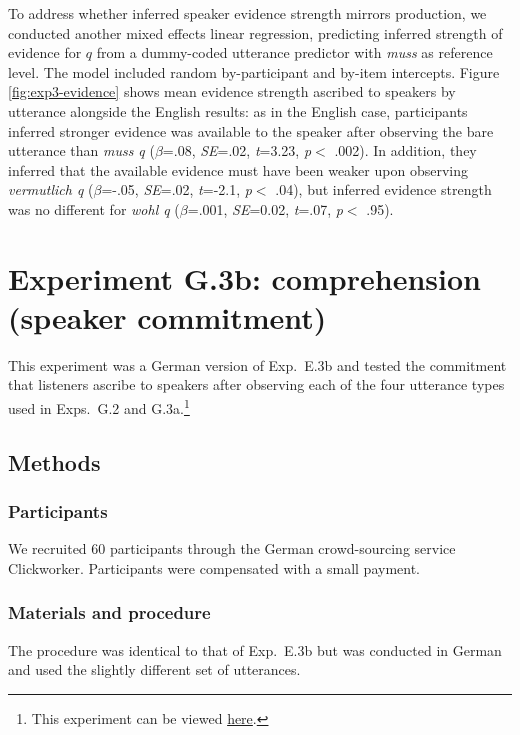 \documentclass[11pt]{article}
\newcommand{\figref}[1]{Figure \ref{#1}}
\begin{document}
To address whether inferred speaker evidence strength mirrors production, we conducted another mixed effects linear regression, predicting inferred strength of evidence for $q$ from a dummy-coded utterance predictor with \emph{muss} as reference level. The model included random by-participant and by-item intercepts.  \figref{fig:exp3-evidence} shows mean evidence strength ascribed to speakers by utterance alongside the English results: as in the English case, participants inferred stronger evidence was available to the speaker after observing the bare utterance than \emph{muss q} ($\beta$=.08, \emph{SE}=.02, \emph{t}=3.23, \emph{p}$<$ .002). In addition, they inferred that the available evidence must have been weaker upon observing \emph{vermutlich q} ($\beta$=-.05, \emph{SE}=.02, \emph{t}=-2.1, \emph{p}$<$ .04), but inferred evidence strength was no different for \emph{wohl q} ($\beta$=.001, \emph{SE}=0.02, \emph{t}=.07, \emph{p}$<$ .95).


\section{Experiment G.3b: comprehension (speaker commitment)}

This experiment was a German version of Exp.~E.3b and tested the commitment that listeners ascribe to speakers after observing each of the four utterance types used in Exps.~G.2 and G.3a.\footnote{This experiment can be viewed \href{http://web.stanford.edu/~jdegen/cgi-bin/1_dp_comprehension_speakerbelief/discourse_particles.html}{here}.}

\subsection{Methods}

\subsubsection{Participants}

We recruited 60 participants through the German crowd-sourcing service Clickworker. Participants were compensated with a small payment.

\subsubsection{Materials and procedure}

The procedure was identical to that of Exp.~E.3b but was conducted in German and used the slightly different set of utterances.
\end{document}

